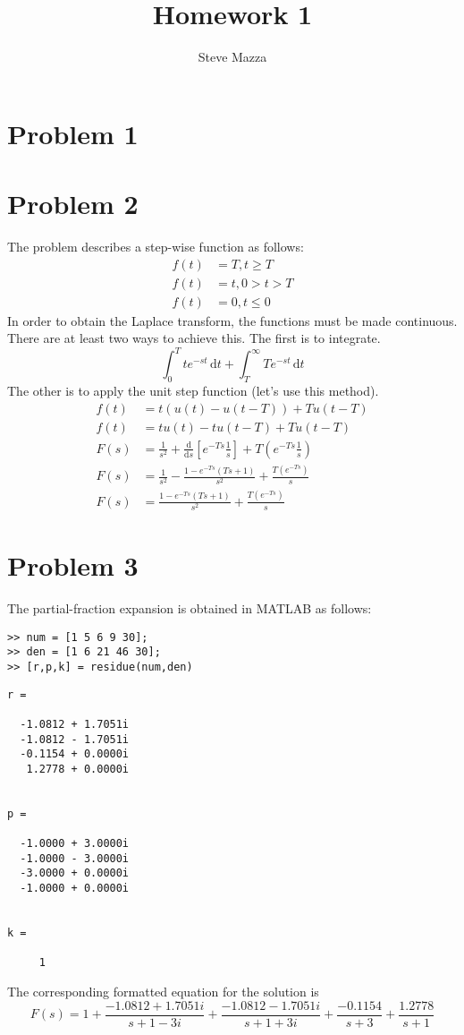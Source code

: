 \documentclass[letterpaper,10pt]{article}
\title{Homework 1}
\author{Steve Mazza}
\begin{document}
\maketitle

\section*{Problem 1}

\section*{Problem 2}
The problem describes a step-wise function as follows:
\begin{align}
	f(t) &= T, t\geq T \\
	f(t) &= t, 0 > t > T \\
	f(t) &= 0, t\leq 0
\end{align}
In order to obtain the Laplace transform, the functions must be made continuous.  There are at least two ways to achieve this.  The first is to integrate.
\begin{equation}
	\int_0^T te^{-st} \, \mathrm{d} t + \int_{T}^{\infty} Te^{-st}\, \mathrm{d}t
\end{equation}
The other is to apply the unit step function (let's use this method).
\begin{align}
	f(t) &= t(u(t)-u(t-T))+Tu(t-T) \\
	f(t) &= tu(t)-tu(t-T)+Tu(t-T) \\
	F(s) &= \frac{1}{s^{2}} + \frac{\mathrm{d}}{\mathrm{d}s}\left[e^{-Ts}\frac{1}{s}\right] + T\left(e^{-Ts}\frac{1}{s}\right) \\
	F(s) &= \frac{1}{s^{2}} - \frac{1 - e^{-Ts}\left(Ts+1\right)}{s^{2}} + \frac{T\left(e^{-Ts}\right)}{s} \\
	F(s) &= \frac{1-e^{-Ts}\left(Ts+1\right)}{s^{2}} + \frac{T\left(e^{-Ts}\right)}{s}
\end{align}

\section*{Problem 3}
The partial-fraction expansion is obtained in MATLAB as follows:
\begin{verbatim}
>> num = [1 5 6 9 30];
>> den = [1 6 21 46 30];
>> [r,p,k] = residue(num,den)
\end{verbatim}
\color{lightgray} \begin{verbatim}
r =

  -1.0812 + 1.7051i
  -1.0812 - 1.7051i
  -0.1154 + 0.0000i
   1.2778 + 0.0000i


p =

  -1.0000 + 3.0000i
  -1.0000 - 3.0000i
  -3.0000 + 0.0000i
  -1.0000 + 0.0000i


k =

     1
\end{verbatim} \color{black}
The corresponding formatted equation for the solution is
\begin{equation}
	F(s) = 1 + \frac{-1.0812+1.7051i}{s+1-3i} + \frac{-1.0812-1.7051i}{s+1+3i} + \frac{-0.1154}{s+3} + \frac{1.2778}{s+1}
\end{equation}
\end{document}
